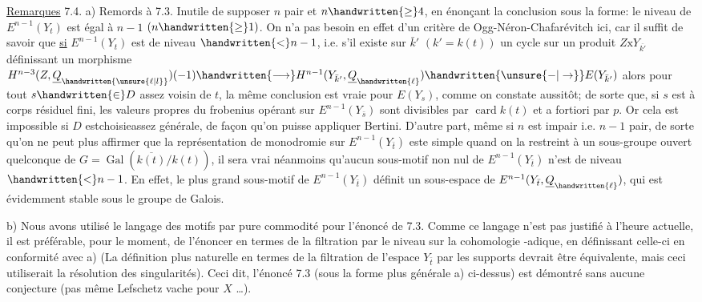 \uline{Remarques} 7.4. a) Remords à 7.3. Inutile de supposer $n$ pair et $n\handwritten{\geq}4$, en énonçant la conclusion sous la forme: le niveau de $E^{n-1}(Y_t)$ est égal à $n-1$ $(n\handwritten{\geq}1)$. On n'a pas besoin en effet d'un critère de Ogg-Néron-Chafarévitch ici, car il suffit de savoir que \uline{si} $E^{n-1}(Y_t)$ est de niveau $\handwritten{<}n-1$, i.e. s'il existe sur  $\bar{k}'$ $(k'=k(t))$ un cycle sur un produit $Z\mathbin{\mathrm{x}}Y_{\overline{k'}}$ définissant un morphisme $H^{n-3}(Z,\underline{Q}_{\handwritten{\unsure{\ell|l}}})(-1)\handwritten{\longrightarrow}H^{n-1}(Y_{\bar{k}'},\underline{Q}_{\handwritten{\ell}})\handwritten{\unsure{-|\to}}E(Y_{\bar{k}'})$  alors pour tout $s\handwritten{\in}D$ assez voisin de $t$, la même conclusion est vraie pour $E(Y_s)$, comme on constate aussitôt; de sorte que, si $s$ est à corps résiduel fini, les valeurs propres du frobenius opérant sur $E^{n-1}(Y_{\bar{s}})$ sont divisibles par  $\operatorname{card}k(t)$ et a fortiori par $p$. Or cela est impossible si $D$ estchoisieassez générale, de façon qu'on puisse appliquer Bertini. D'autre part, même si $n$ est impair i.e. $n-1$ pair, de sorte qu'on ne peut plus affirmer que la  représentation de monodromie sur $E^{n-1}(Y_{\bar t})$ este simple quand on la restreint à un sous-groupe ouvert quelconque de $G=\operatorname{Gal}(\overline{k(t)}/k(t))$, il sera vrai néanmoins qu'aucun sous-motif non nul de $E^{n-1}(Y_{\bar t})$ n'est de niveau $\handwritten{<}n-1$. En effet, le plus grand sous-motif  de $E^{n-1}(Y_{\bar t})$  définit un sous-espace de $E^{n-1}(Y_{\bar t},\underline{Q}_{\handwritten{\ell}})$, qui est évidemment stable sous le groupe de Galois.

b) Nous avons utilisé le langage des motifs par pure commodité pour l'énoncé de 7.3. Comme ce langage n'est pas justifié à l'heure actuelle, il est préférable, pour le moment, de l'énoncer en termes de la filtration par le niveau sur la cohomologie \handwritten{$\ell$}-adique, en définissant celle-ci en conformité avec a) (La définition plus naturelle en termes de la filtration de l'espace $Y_{\bar t}$ par les supports devrait être équivalente, mais ceci utiliserait la résolution des singularités). Ceci dit, l'énoncé 7.3 (sous la forme plus générale a) ci-dessus) est démontré sans aucune conjecture (pas même Lefschetz vache pour $X$ \ldots).
